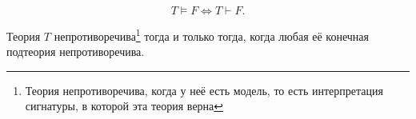\documentclass[a4paper, 12pt, num=ЛП]{listok}
\begin{document}
\begin{theorem}
	\[
		T \models F \Leftrightarrow T \vdash F.
	\]
\end{theorem}
\begin{theorem}
	Теория $T$ непротиворечива\footnote{Теория непротиворечива, когда у неё есть модель, то есть интерпретация сигнатуры, в которой эта теория верна}
	тогда и только тогда, когда любая её конечная подтеория непротиворечива.
\end{theorem}
\end{document}
